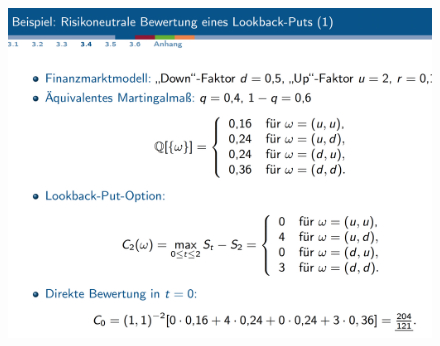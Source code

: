 \documentclass[12pt]{report}
\theoremstyle{dotless}
\theoremstyle{definition}
\begin{document}
\begin{figure}[H]
\centering
\includegraphics[width=\textwidth]{Bilder/LookbackPut.png}
\end{figure}
\end{document}

